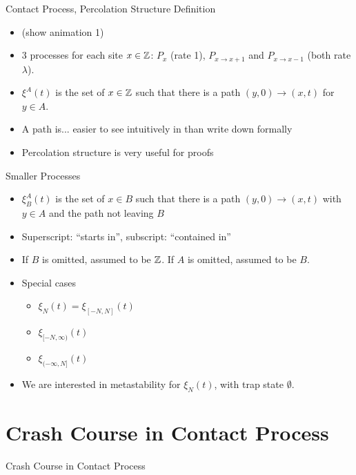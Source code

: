 \documentclass{beamer}
\newcommand{\ignore}[1]{}
\newcommand{\rb}{\ignore{[}]}
\begin{document}
\begin{frame}{Contact Process, Percolation Structure Definition}
  \begin{itemize}
    \item (show animation 1)
    \pause
    \item 3 processes for each site $x \in \mathbb{Z}$: $P_{x}$ (rate 1), $P_{x \to x+1}$ and $P_{x \to x-1}$ (both rate $\lambda$).
    \pause
    \item $\xi^{A}(t)$ is the set of $x \in \mathbb{Z}$ such that there is a path $(y,0) \to (x,t)$ for $y \in A$.
    \pause
    \item A path is... \pause easier to see intuitively in than write down formally
    \pause
    \item Percolation structure is very useful for proofs
  \end{itemize}
\end{frame}

\begin{frame}{Smaller Processes}
  \begin{itemize}
    \item $\xi_{B}^{A}(t)$ is the set of $x \in B$ such that there is a path $(y,0) \to (x,t)$ with $y \in A$ and the path not leaving $B$
          \pause
    \item Superscript: ``starts in'', subscript: ``contained in''
          \pause
    \item If $B$ is omitted, assumed to be $\mathbb{Z}$. If $A$ is omitted, assumed to be $B$.
          \pause
    \item Special cases
    \begin{itemize}
      \item $\xi_{N}(t) = \xi_{[-N,N]}(t)$
      \item $\xi_{[-N,\infty)}(t)$
      \item $\xi_{(-\infty,N\rb}(t)$
    \end{itemize}
          \pause
    \item We are interested in metastability for $\xi_{N}(t)$, with trap state $\emptyset$.
  \end{itemize}
\end{frame}

\section{Crash Course in Contact Process}

\begin{frame}{Crash Course in Contact Process}
  \tableofcontents[currentsection]
\end{frame}
\end{document}
